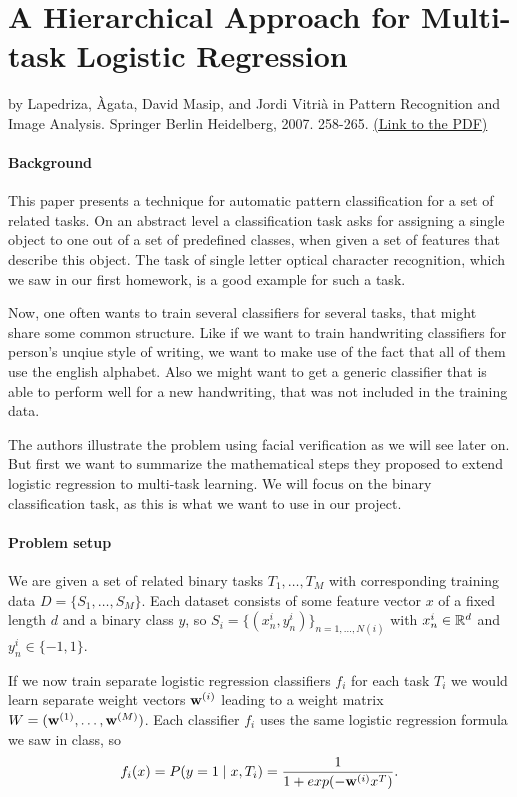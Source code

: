 \section{A Hierarchical Approach for Multi-task Logistic Regression}
by Lapedriza, {\`A}gata, David Masip, and Jordi Vitri{\`a} in Pattern Recognition and Image Analysis. Springer Berlin Heidelberg, 2007. 258-265.
\href{http://link.springer.com/content/pdf/10.1007%2F978-3-540-72849-8_33.pdf}{(Link to the PDF)}

\paragraph{Background} This paper presents a technique for automatic pattern classification for a set of related tasks.
On an abstract level a classification task asks for assigning a single object to one out of a set of predefined classes, when given a set of features that describe this object. The task of single letter optical character recognition, which we saw in our first homework, is a good example for such a task.

Now, one often wants to train several classifiers for several tasks, that might share some common structure. Like if we want to train handwriting classifiers for person's unqiue style of writing, we want to make use of the fact that all of them use the english alphabet. Also we might want to get a generic classifier that is able to perform well for a new handwriting, that was not included in the training data.

The authors illustrate the problem using facial verification as we will see later on. But first we want to summarize the mathematical steps they proposed to extend logistic regression to multi-task learning. We will focus on the binary classification task, as this is what we want to use in our project.

\paragraph{Problem setup}
We are given a set of related binary tasks $T_1, \dots, T_M$ with corresponding training data $D = \{S_1, \dots, S_M\}$. Each dataset consists of some feature vector $x$ of a fixed length $d$ and a binary class $y$, so $S_i = \{(x_n^i, y_n^i)\}_{n=1,\dots,N(i)}$ with $x_n^i \in \mathbb{R}^d$ and $y_n^i \in \{-1,1\}$.

If we now train separate logistic regression classifiers $f_i$ for each task $T_i$ we would learn separate weight vectors $\textbf{w}^{(i)}$ leading to a weight matrix $W = (\textbf{w}^{(1)}, \dots, \textbf{w}^{(M)})$. Each classifier $f_i$ uses the same logistic regression formula we saw in class, so
\begin{align*}
f_i(x) = P(y=1 \mid x, T_i) = \frac{1}{1+exp(-\textbf{w}^{(i)} x^T)}.
\end{align*}


